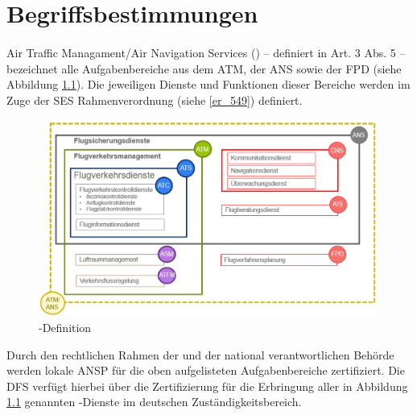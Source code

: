\chapter{Begriffsbestimmungen}
\subsubsection{\atmansf} \label{beg:atmans}
    
    Air Traffic Managament/Air Navigation Services (\atmans) -- definiert in  Art. 3 Abs. 5 -- bezeichnet alle Aufgabenbereiche aus dem \acf{ATM}, der \acf{ANS} sowie der \acf{FPD} (siehe Abbildung \ref{fig:atmans}).
    Die jeweiligen Dienste und Funktionen dieser Bereiche werden im Zuge der \ac{SES} Rahmenverordnung (siehe \ref{er_549}) definiert.
    
    \begin{figure}[h!]
        \centering
        \includegraphics[width=\linewidth]{gfx/atmans.png}
        \caption{\atmansf-Definition \cite{ba_technik}}
        \label{fig:atmans}
    \end{figure}

    \noindent
    Durch den rechtlichen Rahmen der  und der national verantwortlichen Behörde werden lokale \acf{ANSP} für die oben aufgelisteten Aufgabenbereiche zertifiziert.
    Die \ac{DFS} verfügt hierbei über die Zertifizierung für die Erbringung aller in Abbildung \ref{fig:atmans} genannten \atmans-Dienste im deutschen Zuständigkeitsbereich. \cite[vgl.][17]{ba_technik}
    

